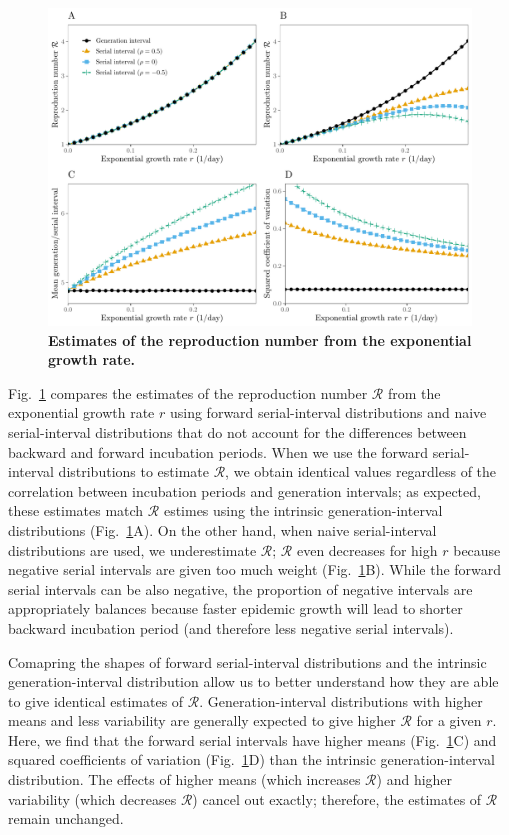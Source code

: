 \documentclass[12pt]{article}
\newcommand{\fref}[1]{Fig.~\ref{fig:#1}}
\begin{document}
\begin{figure}[!ht]
\includegraphics[width=\textwidth]{rR.pdf}
\caption{
\textbf{Estimates of the reproduction number from the exponential growth rate.}
}
\label{fig:rR}
\end{figure}

\fref{rR} compares the estimates of the reproduction number $\mathcal R$ from the exponential growth rate $r$ using forward serial-interval distributions and naive serial-interval distributions that do not account for the differences between backward and forward incubation periods.
When we use the forward serial-interval distributions to estimate $\mathcal R$, we obtain identical values regardless of the correlation between incubation periods and generation intervals;
as expected, these estimates match $\mathcal R$ estimes using the intrinsic generation-interval distributions (\fref{rR}A).
On the other hand, when naive serial-interval distributions are used, we underestimate $\mathcal R$; $\mathcal R$ even decreases for high $r$ because negative serial intervals are given too much weight (\fref{rR}B).
While the forward serial intervals can be also negative, the proportion of negative intervals are appropriately balances because faster epidemic growth will lead to shorter backward incubation period (and therefore less negative serial intervals).

Comapring the shapes of forward serial-interval distributions and the intrinsic generation-interval distribution allow us to better understand how they are able to give identical estimates of $\mathcal R$.
Generation-interval distributions with higher means and less variability are generally expected to give higher $\mathcal R$ for a given $r$.
Here, we find that the forward serial intervals have higher means (\fref{rR}C) and squared coefficients of variation (\fref{rR}D) than the intrinsic generation-interval distribution.
The effects of higher means (which increases $\mathcal R$) and higher variability (which decreases $\mathcal R$) cancel out exactly;
therefore, the estimates of $\mathcal R$ remain unchanged.
\end{document}
